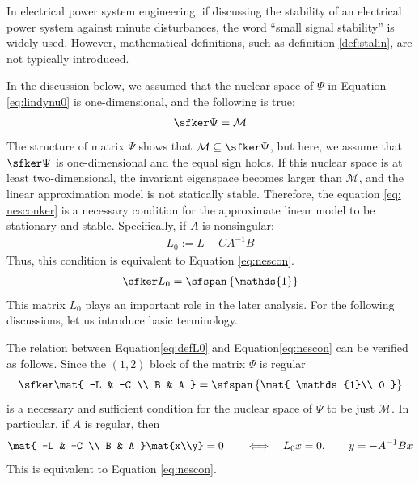 \documentclass[graybox, envcountchap]{svmult}
\begin{document}
In electrical power system engineering, if discussing the stability of an electrical power system against minute disturbances, the word “small signal stability” is widely used.
However, mathematical definitions, such as definition \ref{def:stalin}, are not typically introduced.

In the discussion below, we assumed that the nuclear space of $\Psi$ in Equation \ref{eq:lindynu0} is one-dimensional, and the following is true:
\begin{align}\label{eq:nesconker}
\sfker \Psi = \mathcal{M}
\end{align}
The structure of matrix $\Psi$ shows that $\mathcal{M} \subseteq \sfker \Psi $, but here, we assume that $\sfker \Psi$ is one-dimensional and the equal sign holds.
If this nuclear space is at least two-dimensional, the invariant eigenspace becomes larger than $\mathcal{M}$, and the linear approximation model is not statically stable.
Therefore, the equation \ref{eq: nesconker} is a necessary condition for the approximate linear model to be stationary and stable.
Specifically, if $A$ is nonsingular:
\begin{align}\label{eq:defL0}
L_0:= L-CA^{-1}B 
\end{align}
Thus, this condition is equivalent to Equation \ref{eq:nescon}. 
\begin{align}\label{eq:nescon}
\sfker L_0 = \sfspan
\left\{
\mathds{1}
\right\}
\end{align}
This matrix $L_0$ plays an important role in the later analysis.
For the following discussions, let us introduce basic terminology.

The relation between Equation\ref{eq:defL0} and Equation\ref{eq:nescon} can be verified as follows.
Since the $(1,2)$ block of the matrix $\Psi$ is regular
\begin{align*}%
\sfker \mat{
-L & -C \\
B & A
}
= \sfspan
\left\{
\mat{
\mathds{1}\\
0
}
\right\}
\end{align*}
is a necessary and sufficient condition for the nuclear space of $\Psi$ to be just $\mathcal{M}$.
In particular, if $A$ is regular, then
\begin{align*}
\mat{
-L & -C \\
B & A
}\mat{x\\y}
=0
\qquad
\Longleftrightarrow
\quad
L_0 x=0,
\qquad
y=-A^{-1}Bx
\end{align*}
This is equivalent to Equation \ref{eq:nescon}.
\end{document}
